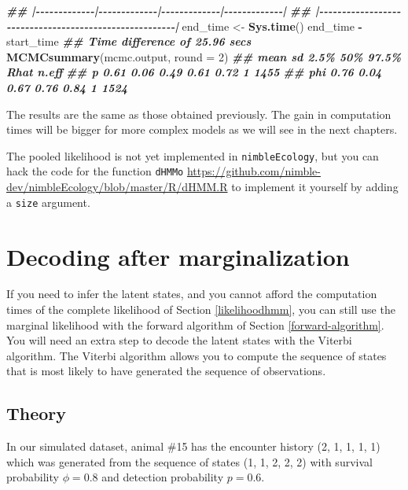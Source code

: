 \documentclass[
  12pt,
]{krantz}
\newenvironment{Shaded}{\begin{snugshade}}{\end{snugshade}}
\newcommand{\AttributeTok}[1]{\textcolor[rgb]{0.13,0.29,0.53}{#1}}
\newcommand{\DecValTok}[1]{\textcolor[rgb]{0.00,0.00,0.81}{#1}}
\newcommand{\DocumentationTok}[1]{\textcolor[rgb]{0.56,0.35,0.01}{\textbf{\textit{#1}}}}
\newcommand{\FunctionTok}[1]{\textcolor[rgb]{0.13,0.29,0.53}{\textbf{#1}}}
\newcommand{\NormalTok}[1]{#1}
\newcommand{\OtherTok}[1]{\textcolor[rgb]{0.56,0.35,0.01}{#1}}
\newcommand{\SpecialCharTok}[1]{\textcolor[rgb]{0.81,0.36,0.00}{\textbf{#1}}}
\begin{document}
\begin{Shaded}
\begin{Highlighting}[]
\DocumentationTok{\#\# |{-}{-}{-}{-}{-}{-}{-}{-}{-}{-}{-}{-}{-}|{-}{-}{-}{-}{-}{-}{-}{-}{-}{-}{-}{-}{-}|{-}{-}{-}{-}{-}{-}{-}{-}{-}{-}{-}{-}{-}|{-}{-}{-}{-}{-}{-}{-}{-}{-}{-}{-}{-}{-}|}
\DocumentationTok{\#\# |{-}{-}{-}{-}{-}{-}{-}{-}{-}{-}{-}{-}{-}{-}{-}{-}{-}{-}{-}{-}{-}{-}{-}{-}{-}{-}{-}{-}{-}{-}{-}{-}{-}{-}{-}{-}{-}{-}{-}{-}{-}{-}{-}{-}{-}{-}{-}{-}{-}{-}{-}{-}{-}{-}{-}|}
\NormalTok{end\_time }\OtherTok{\textless{}{-}} \FunctionTok{Sys.time}\NormalTok{()}
\NormalTok{end\_time }\SpecialCharTok{{-}}\NormalTok{ start\_time}
\DocumentationTok{\#\# Time difference of 25.96 secs}
\FunctionTok{MCMCsummary}\NormalTok{(mcmc.output, }\AttributeTok{round =} \DecValTok{2}\NormalTok{)}
\DocumentationTok{\#\#     mean   sd 2.5\%  50\% 97.5\% Rhat n.eff}
\DocumentationTok{\#\# p   0.61 0.06 0.49 0.61  0.72    1  1455}
\DocumentationTok{\#\# phi 0.76 0.04 0.67 0.76  0.84    1  1524}
\end{Highlighting}
\end{Shaded}

The results are the same as those obtained previously. The gain in computation times will be bigger for more complex models as we will see in the next chapters.

The pooled likelihood is not yet implemented in \texttt{nimbleEcology}, but you can hack the code for the function \texttt{dHMMo} \url{https://github.com/nimble-dev/nimbleEcology/blob/master/R/dHMM.R} to implement it yourself by adding a \texttt{size} argument.

\section{Decoding after marginalization}\label{decoding}

If you need to infer the latent states, and you cannot afford the computation times of the complete likelihood of Section \ref{likelihoodhmm}, you can still use the marginal likelihood with the forward algorithm of Section \ref{forward-algorithm}. You will need an extra step to decode the latent states with the Viterbi algorithm. The Viterbi algorithm allows you to compute the sequence of states that is most likely to have generated the sequence of observations.

\subsection{Theory}\label{viterbi-theory}

In our simulated dataset, animal \#15 has the encounter history (2, 1, 1, 1, 1) which was generated from the sequence of states (1, 1, 2, 2, 2) with survival probability \(\phi = 0.8\) and detection probability \(p = 0.6\).
\end{document}

